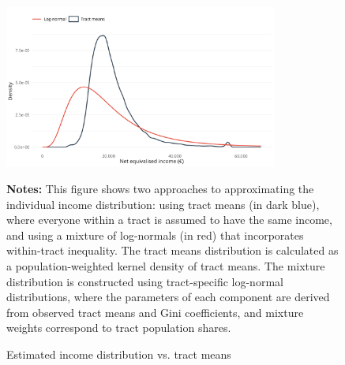 \begin{figure}[H]
\begin{center}
\captionsetup{justification=centering}
\caption{Estimated income distribution vs. tract means}
\label{fig:distributions}
\includegraphics[width=0.8\textwidth]{output/tract_vs_individual_income_distribution.png}
\end{center}
\begin{fignotes2}
\textbf{Notes:} This figure shows two approaches to approximating the individual income distribution: using tract means (in dark blue), where everyone within a tract is assumed to have the same income, and using a mixture of log-normals (in red) that incorporates within-tract inequality. The tract means distribution is calculated as a population-weighted kernel density of tract means. The mixture distribution is constructed using tract-specific log-normal distributions, where the parameters of each component are derived from observed tract means and Gini coefficients, and mixture weights correspond to tract population shares.
\end{fignotes2}
\end{figure}